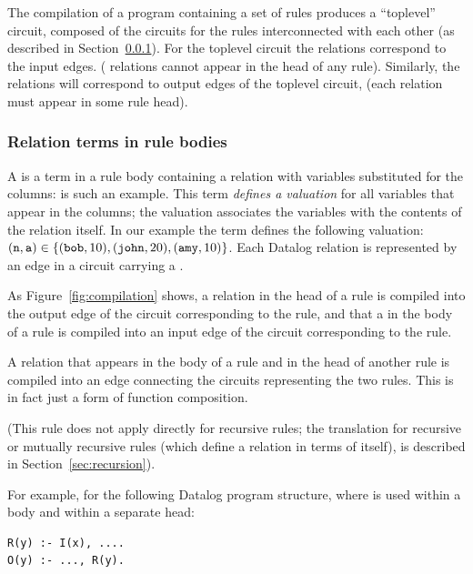 The compilation of a program containing a set of rules produces a ``toplevel'' circuit,
composed of the circuits for the rules interconnected with each other (as described
in Section~\ref{sec:connections}).
For the toplevel circuit the  relations correspond to the input
edges.  ( relations cannot appear in the head of any rule).  Similarly,
the  relations will correspond to output edges of the toplevel circuit,
(each  relation must appear in some rule head).

\subsubsection{Relation terms in rule bodies}\label{sec:connections}

A  is a term in a rule body containing a relation with variables substituted
for the columns:  is such an example.
This term \emph{defines a valuation} for all variables that appear in the columns;
the valuation associates the variables with the contents of the relation itself.  In our example
the term  defines the following valuation:
$(\mbox{\texttt{n}}, \mbox{\texttt{a}}) \in \{ (\mbox{\texttt{bob}}, 10), (\mbox{\texttt{john}}, 20), (\mbox{\texttt{amy}}, 10) \}$.
Each Datalog relation is represented by an edge in a circuit
carrying a \zr.

As Figure~\ref{fig:compilation} shows, a relation in the head of a rule is compiled into the
output edge of the circuit corresponding to the rule, and that a 
in the body of a rule is compiled into an input edge of the circuit
corresponding to the rule.

A relation that appears in the body of a rule and in the head of another
rule is compiled into an edge connecting the circuits representing the two rules.
This is in fact just a form of function composition.

(This rule does not apply directly for recursive rules; the translation for recursive
or mutually recursive rules (which define a relation
in terms of itself), is described in Section~\ref{sec:recursion}).

For example, for the following Datalog program structure, where  is used
within a body and within a separate head:

\begin{lstlisting}[language=ddlog]
R(y) :- I(x), ....
O(y) :- ..., R(y).
\end{lstlisting}

